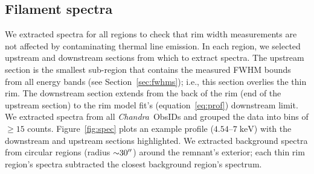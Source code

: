 \documentclass[iop, apj, numberedappendix, twocolappendix]{emulateapj}
\newcommand*{\mt}{\mathrm}
\newcommand*{\unit}[1]{\;\mt{#1}}  %
\newcommand*{\abt}{\mathord{\sim}} %
\newcommand*{\Chandra}{\textit{Chandra}\ }
\begin{document}
\subsection{Filament spectra}
\label{sec:spec}

We extracted spectra for all regions to check that rim width measurements are
not affected by contaminating thermal line emission.  In each region, we
selected upstream and downstream sections from which to extract spectra.  The
upstream section is the smallest sub-region that contains the measured FWHM
bounds from all energy bands (see Section~\ref{sec:fwhms}); i.e., this section
overlies the thin rim.  The downstream section extends from the back of the rim
(end of the upstream section) to the rim model fit's (equation~\eqref{eq:prof})
downstream limit.  We extracted spectra from all \Chandra ObsIDs and grouped
the data into bins of $\geq 15$ counts.  Figure~\ref{fig:spec} plots an example
profile ($4.54$--$7 \unit{keV}$) with the downstream and upstream sections
highlighted.  We extracted background spectra from circular regions (radius
$\abt 30\arcsec$) around the remnant's exterior; each thin rim region's spectra
subtracted the closest background region's spectrum.

\begin{figure*}
    \caption{Spectra and fits from Regions 1 (top) and 16 (bottom) show varying
    rim morphology and example of rim where 0.7--1 keV peak could not be fit.
    Left: $4.5$--$7 \unit{keV}$ profile with highlighted downstream (blue) and
    upstream (grey) sections.  Intensity in arbitrary units (a.u.).  Middle:
    downstream spectrum with absorbed power law fit; Si and S lines at $1.85$,
    $2.45 \unit{keV}$ are clearly visible.  Right: upstream spectrum with
    absorbed power law fit shows that each region is likely free of thermal
    line
emission.}
    \label{fig:spec}
\end{figure*}
\end{document}

